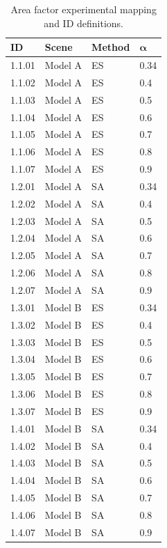 \begin{table}[!t]
\centering
\footnotesize
\caption{Area factor experimental mapping and ID definitions.}
\label{tab:area_params}
\begin{tabular}{@{}llll@{}}
\hline
    \textbf{ID} & \textbf{Scene} & \textbf{Method} & $\bm{\alpha}$ \\
\hline
    1.1.01 & Model A & ES & 0.34 \\
    1.1.02 & Model A & ES & 0.4 \\
    1.1.03 & Model A & ES & 0.5 \\
    1.1.04 & Model A & ES & 0.6 \\
    1.1.05 & Model A & ES & 0.7 \\
    1.1.06 & Model A & ES & 0.8 \\
    1.1.07 & Model A & ES & 0.9 \\
    \noalign{\smallskip}
    1.2.01 & Model A & SA & 0.34 \\
    1.2.02 & Model A & SA & 0.4 \\
    1.2.03 & Model A & SA & 0.5 \\
    1.2.04 & Model A & SA & 0.6 \\
    1.2.05 & Model A & SA & 0.7 \\
    1.2.06 & Model A & SA & 0.8 \\
    1.2.07 & Model A & SA & 0.9 \\
    \noalign{\smallskip}
    1.3.01 & Model B & ES & 0.34 \\
    1.3.02 & Model B & ES & 0.4 \\
    1.3.03 & Model B & ES & 0.5 \\
    1.3.04 & Model B & ES & 0.6 \\
    1.3.05 & Model B & ES & 0.7 \\
    1.3.06 & Model B & ES & 0.8 \\
    1.3.07 & Model B & ES & 0.9 \\
    \noalign{\smallskip}
    1.4.01 & Model B & SA & 0.34 \\
    1.4.02 & Model B & SA & 0.4 \\
    1.4.03 & Model B & SA & 0.5 \\
    1.4.04 & Model B & SA & 0.6 \\
    1.4.05 & Model B & SA & 0.7 \\
    1.4.06 & Model B & SA & 0.8 \\
    1.4.07 & Model B & SA & 0.9 \\
\hline
\end{tabular}
\end{table}